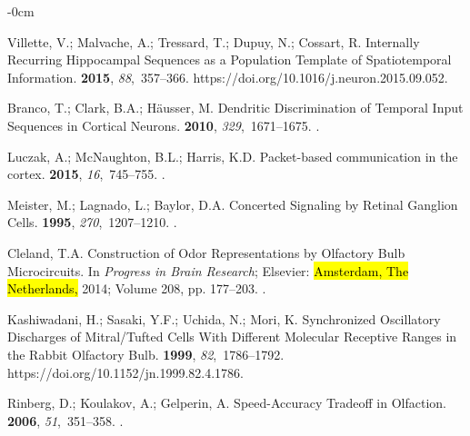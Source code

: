 \documentclass[brainsci, %
               review,accept,pdftex,moreauthors
               ]{Definitions/mdpi}
\begin{document}
\begin{adjustwidth}{-\extralength}{0cm}
\begin{thebibliography}{999}
Villette, V.; Malvache, A.; Tressard, T.; Dupuy, N.; Cossart, R.
\newblock Internally {Recurring} {Hippocampal} {Sequences} as a {Population}
  {Template} of {Spatiotemporal} {Information}.
 {\bf 2015}, {\em 88},~357--366.
 {{https://doi.org/10.1016/j.neuron.2015.09.052}}.

Branco, T.; Clark, B.A.; Häusser, M.
\newblock Dendritic {Discrimination} of {Temporal} {Input} {Sequences} in
  {Cortical} {Neurons}.
 {\bf 2010}, {\em 329},~1671--1675.
.

Luczak, A.; McNaughton, B.L.; Harris, K.D.
\newblock Packet-based communication in the cortex.
 {\bf 2015}, {\em 16},~745--755.
.

Meister, M.; Lagnado, L.; Baylor, D.A.
\newblock Concerted {Signaling} by {Retinal} {Ganglion} {Cells}.
 {\bf 1995}, {\em 270},~1207--1210.
.

Cleland, T.A.
\newblock Construction of {Odor} {Representations} by {Olfactory} {Bulb}
  {Microcircuits}. In {\em Progress in {Brain} {Research}}; Elsevier:  \hl{Amsterdam, The Netherlands,} %
  2014;
  Volume 208, pp. 177--203.
.

Kashiwadani, H.; Sasaki, Y.F.; Uchida, N.; Mori, K.
\newblock Synchronized {Oscillatory} {Discharges} of {Mitral}/{Tufted} {Cells}
  {With} {Different} {Molecular} {Receptive} {Ranges} in the {Rabbit}
  {Olfactory} {Bulb}.
 {\bf 1999}, {\em 82},~1786--1792.\linebreak
  {{https://doi.org/10.1152/jn.1999.82.4.1786}}.

Rinberg, D.; Koulakov, A.; Gelperin, A.
\newblock Speed-{Accuracy} {Tradeoff} in {Olfaction}.
 {\bf 2006}, {\em 51},~351--358.\linebreak
{}.


\end{thebibliography}
\end{adjustwidth}
\end{document}
